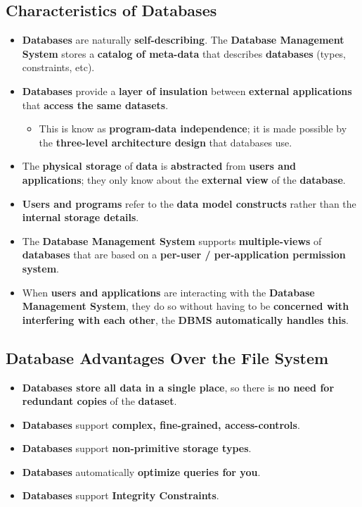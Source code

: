 \documentclass{article}
\begin{document}
    \subsection*{Characteristics of Databases}
    \begin{itemize}
        \item \textbf{Databases} are naturally \textbf{self-describing}. The \textbf{Database Management System} stores a \textbf{catalog of meta-data} that describes \textbf{databases} (types, constraints, etc).
        \item \textbf{Databases} provide a \textbf{layer of insulation} between \textbf{external applications} that \textbf{access the same datasets}.
        \begin{itemize}
            \item This is know as \textbf{program-data independence}; it is made possible by the \textbf{three-level architecture design} that databases use.
        \end{itemize}
        \item The \textbf{physical storage} of \textbf{data} is \textbf{abstracted} from \textbf{users and applications}; they only know about the \textbf{external view} of the \textbf{database}.
        \item \textbf{Users and programs} refer to the \textbf{data model constructs} rather than the \textbf{internal storage details}.
        \item The \textbf{Database Management System} supports \textbf{multiple-views} of \textbf{databases} that are based on a \textbf{per-user / per-application permission system}.
        \item When \textbf{users and applications} are interacting with the \textbf{Database Management System}, they do so without having to be \textbf{concerned with interfering with each other}, the \textbf{DBMS automatically handles this}.
    \end{itemize}
    
    \subsection*{Database Advantages Over the File System}
    \begin{itemize}
        \item \textbf{Databases store all data in a single place}, so there is \textbf{no need for redundant copies} of the \textbf{dataset}.
        \item \textbf{Databases} support \textbf{complex, fine-grained, access-controls}.
        \item \textbf{Databases} support \textbf{non-primitive storage types}.
        \item \textbf{Databases} automatically \textbf{optimize queries for you}.
        \item \textbf{Databases} support \textbf{Integrity Constraints}.
    \end{itemize}
    
\end{document}

